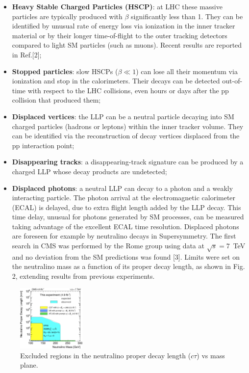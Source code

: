 \documentclass[twocolumn,twoside,10pt,nodate]{article}
\begin{document}
\begin{itemize}
\item {\bf Heavy Stable Charged Particles (HSCP)}: at LHC these massive 
particles are typically produced with $\beta$ significantly less than
1. They can be
identified by unusual rate of energy loss via ionization in the inner
tracker material or by their 
longer time-of-flight to the outer tracking detectors
compared to light SM particles (such as muons). 
Recent results are reported in Ref.[2];
\item {\bf Stopped particles}: slow HSCPs ($\beta \ll 1$) can lose all 
their momentum via ionization and stop in the calorimeters. 
  Their decays can be detected out-of-time with respect to the
  LHC collisions, even hours or days after the pp collision that produced
  them;
\item {\bf Displaced vertices}: the LLP can be a neutral particle
  decaying into SM charged particles (hadrons or leptons) within the
  inner tracker volume. They can be identified via the reconstruction
  of decay vertices displaced from the pp interaction point;
\item {\bf Disappearing tracks}: a disappearing-track signature can be produced by a
  charged LLP whose decay products are undetected;
\item {\bf Displaced photons}: a neutral LLP can decay to a photon and a weakly
  interacting particle. 
The photon arrival at
  the electromagnetic calorimeter (ECAL) is delayed, due to extra flight
  length added by the LLP decay. This time delay, unusual for photons
  generated by SM processes, can be measured taking advantage of the
  excellent ECAL time resolution. Displaced photons are foreseen for
  example by neutralino decays in Supersymmetry. 
The first search in CMS was performed by the Rome group using data at
$\sqrt{s}=7$~TeV and no deviation from the SM predictions was found [3].
Limits were set on the neutralino mass as a function of its proper
decay length, as shown in Fig. 2, extending results from previous experiments.
\end{itemize}

\begin{figure}[h]
\centering
\includegraphics[width=0.30\textwidth,angle=0]{santanastasio_fig2.png}
\caption{\small Excluded regions in the neutralino proper decay length
  ($c\tau$) vs mass plane.} %
\end{figure}
\end{document}
